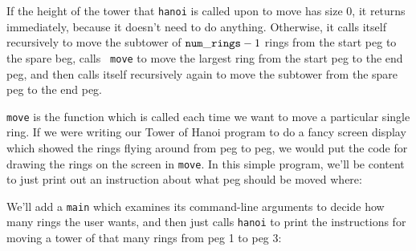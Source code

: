If the height of the tower that {\tt hanoi} is called upon to move has
size 0, it returns immediately, because it doesn't need to do anything.
Otherwise, it calls itself recursively to move the subtower of ${\tt
num\_rings} - 1$ rings from the start peg to the spare beg, calls {\tt
move} to move the largest ring from the start peg to the end peg, and
then calls itself recursively again to move the subtower from the spare
peg to the end peg.

\begin{flushleft}
\verb%void%
\\* \verb%  hanoi(int num_rings,%
\\* \verb%        int start_peg, %
\\* \verb%        int end_peg)%
\\* \verb%{%
\\* \verb%  int spare_peg = 6 - start_peg - end_peg;%

\verb%  if (num_rings > 0) {%
\\* \verb%    hanoi(num_rings - 1, start_peg, spare_peg);%
\\* \verb%    move(num_rings, start_peg, end_peg);%
\\* \verb%    hanoi(num_rings - 1, spare_peg, end_peg);%
\\* \verb%  }%

\verb%  return;%
\\* \verb%}%
\end{flushleft}

{\tt move} is the function which is called each time we want to move a
particular single ring.  If we were writing our Tower of Hanoi program
to do a fancy screen display which showed the rings flying around from
peg to peg, we would put the code for drawing the rings on the screen in
{\tt move}.  In this simple program, we'll be content to just print out
an instruction about what peg should be moved where:

\begin{flushleft}
\verb%void move(int ring_num, int start, int end)%
\\* \verb%{%
\\* \verb%  printf("Move disk %\verb-%-\verb%d from peg %\verb-%-\verb%d onto peg %\verb-%-\verb%d.\n", %
\\* \verb%         ring_num, start, end);%

\verb%  return;%
\\* \verb%}%
\end{flushleft}

We'll add a {\tt main} which examines its command-line arguments
to decide how many rings the user wants, and then just calls {\tt hanoi}
to print the instructions for moving a tower of that many rings from peg
1 to peg 3:

